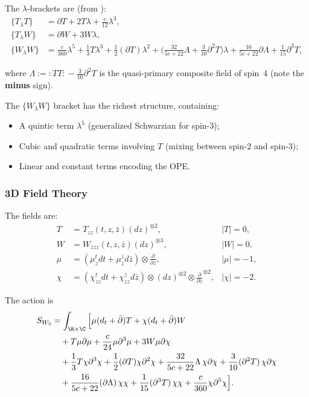 The $\lambda$-brackets are (from \cite{KZ25}):
\begin{align}
\{T_\lambda T\} &= \partial T + 2T\lambda + \frac{c}{12}\lambda^3,\\
\{T_\lambda W\} &= \partial W + 3W\lambda,\\
\{W_\lambda W\} &= \frac{c}{360}\lambda^5 + \frac{1}{3}T\lambda^3 + \frac{1}{2}(\partial T)\lambda^2 + \biggl(\frac{32}{5c + 22}\Lambda + \frac{3}{10}\partial^2 T\biggr)\lambda + \frac{16}{5c + 22}\partial\Lambda + \frac{1}{15}\partial^3 T,
\end{align}

\noindent
where $\Lambda := {:\!TT\!:} - \tfrac{3}{10}\partial^2 T$ is the quasi-primary composite field of spin~$4$ (note the \textbf{minus} sign).

\begin{remark}[Structure of $W_3$]
The $\{W_\lambda W\}$ bracket has the richest structure, containing:
\begin{itemize}
\item A quintic term $\lambda^5$ (generalized Schwarzian for spin-3);
\item Cubic and quadratic terms involving $T$ (mixing between spin-2 and spin-3);
\item Linear and constant terms encoding the OPE.
\end{itemize}
\end{remark}

\subsubsection{3D Field Theory}

The fields are:
\begin{align}
T &= T_{zz}(t,z,\bar{z}) (dz)^{\otimes 2}, & |T| = 0,\\
W &= W_{zzz}(t,z,\bar{z}) (dz)^{\otimes 3}, & |W| = 0,\\
\mu &= (\mu^t_z dt + \mu^{\bar{z}}_z d\bar{z}) \otimes \frac{\partial}{\partial z}, & |\mu| = -1,\\
\chi &= (\chi^t_{zz} dt + \chi^{\bar{z}}_{zz} d\bar{z}) \otimes (dz)^{\otimes 2} \otimes \frac{\partial}{\partial z}^{\otimes 2}, & |\chi| = -2.
\end{align}

The action is
\begin{align}
S_{W_3} &= \int_{\R \times \C} \Big[ \mu (d_t + \bar{\partial})T + \chi (d_t + \bar{\partial})W \notag\\
&\quad + T \mu \partial \mu + \frac{c}{24} \mu \partial^3 \mu + 3W \mu \partial \chi \notag\\
&\quad + \frac{1}{3}T \chi \partial^3 \chi + \frac{1}{2}(\partial T) \chi \partial^2 \chi + \frac{32}{5c+22}\Lambda\, \chi \partial \chi + \frac{3}{10}(\partial^2 T)\,\chi \partial \chi \notag\\
&\quad + \frac{16}{5c+22}(\partial\Lambda)\, \chi \chi + \frac{1}{15}(\partial^3 T)\,\chi \chi + \frac{c}{360} \chi \partial^5 \chi \Big].
\end{align}

